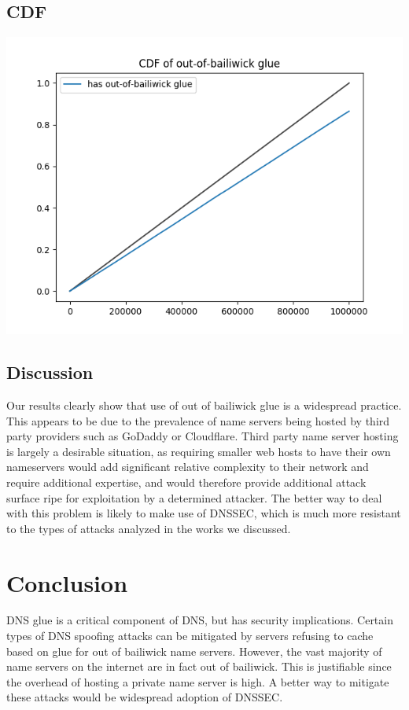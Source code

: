 \documentclass{idc_msc}
\begin{document}
\subsection{CDF}
\includegraphics[width=15cm]{cdf.png}

\subsection{Discussion}
Our results clearly show that use of out of bailiwick glue is a widespread practice. This appears to be due to the prevalence of name servers being hosted by third party providers such as GoDaddy or Cloudflare. Third party name server hosting is largely a desirable situation, as requiring smaller web hosts to have their own nameservers would add significant relative complexity to their network and require additional expertise, and would therefore provide additional attack surface ripe for exploitation by a determined attacker. The better way to deal with this problem is likely to make use of DNSSEC, which is much more resistant to the types of attacks analyzed in the works we discussed.

\section{Conclusion}

DNS glue is a critical component of DNS, but has security implications. Certain types of DNS spoofing attacks can be mitigated by servers refusing to cache based on glue for out of bailiwick name servers. However, the vast majority of name servers on the internet are in fact out of bailiwick. This is justifiable since the overhead of hosting a private name server is high. A better way to mitigate these attacks would be widespread adoption of DNSSEC.
\end{document}
